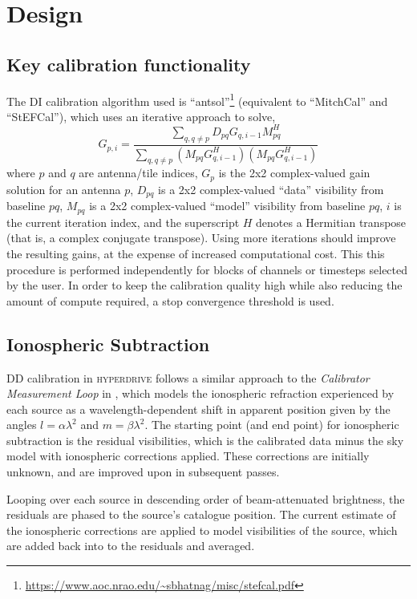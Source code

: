 \documentclass[summary]{ursi}
\newcommand{\hyperdrive}{\textsc{hyperdrive}}\newcommand{\mwalib}{\textsc{mwalib}}
\begin{document}
\section{Design}

\subsection{Key calibration functionality}
The DI calibration algorithm used is ``antsol''\footnote{\url{https://www.aoc.nrao.edu/~sbhatnag/misc/stefcal.pdf}} (equivalent to ``MitchCal'' and ``StEFCal''), which uses an iterative approach to solve,
\begin{equation*}
  G_{p,i} = \frac{ \sum_{q,q \neq p} D_{pq} G_{q,i-1} M_{pq}^H }{ \sum_{q,q \neq p} \left( M_{pq} G_{q,i-1}^H \right) \left( M_{pq} G_{q,i-1}^H \right) }
\end{equation*}
where $p$ and $q$ are antenna/tile indices, $G_p$ is the 2x2 complex-valued gain solution for
an antenna $p$, $D_{pq}$ is a 2x2 complex-valued ``data'' visibility from baseline $pq$, $M_{pq}$
is a 2x2 complex-valued ``model'' visibility from baseline $pq$, $i$ is the current iteration
index, and the superscript $H$ denotes a Hermitian transpose (that is, a complex
conjugate transpose). 
Using more iterations should improve the resulting gains, at the expense of increased computational cost. 
This this procedure is performed independently for blocks of channels or timesteps selected by the user.
In order to keep the calibration quality high while also reducing the amount of compute required, a stop convergence threshold is used.

\subsection{Ionospheric Subtraction}
DD calibration in \hyperdrive{} follows a similar approach to the \textit{Calibrator Measurement Loop} in \cite{mitchell2008}, which models the ionospheric refraction experienced by each source as a wavelength-dependent shift in apparent position given by the angles $l=\alpha\lambda^2$ and $m=\beta\lambda^2$.
The starting point (and end point) for ionospheric subtraction is the residual visibilities, which is the calibrated data minus the sky model with ionospheric corrections applied. 
These corrections are initially unknown, and are improved upon in subsequent passes.

Looping over each source in descending order of beam-attenuated brightness, the residuals are phased to the source's catalogue position.
The current estimate of the ionospheric corrections are applied to model visibilities of the source, which are added back into to the residuals and averaged. %
\end{document}
